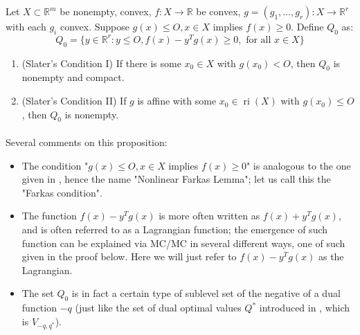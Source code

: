 \begin{prop}\label{prop:041-farkas-lemma-nonlinear}
	Let $X\subset \mathbb{R}^m$ be nonempty, convex, $f:X\to \mathbb{R}$ be convex, $g=(g_1,\dotsc,g_r):X\to \mathbb{R}^r$ with each $g_i$ convex. Suppose $g(x)\leq O,x\in X$ implies $f(x)\geq 0$. Define $Q_0$ as:
	\[
		Q_0=\{y\in \mathbb{R}^r:y\leq O,f(x)-y^Tg(x)\geq0,\text{ for all }x\in X\}
	\]
	\begin{enumerate}[label=(\alph*)]
		\item (Slater's Condition I) If there is some $x_0\in X$ with $g(x_0)<O$, then $Q_0$ is nonempty and compact.
		\item (Slater's Condition II) If $g$ is affine with some $x_0\in \operatorname{ri}(X)$ with $g(x_0)\leq O$, then $Q_0$ is nonempty.
	\end{enumerate}
\end{prop}

\paragraph{}Several comments on this proposition:
\begin{itemize}
	\item The condition "$g(x)\leq O,x\in X$ implies $f(x)\geq 0$" is analogous to the one given in , hence the name "Nonlinear Farkas Lemma"; let us call this the "Farkas condition".
	\item The function $f(x)-y^Tg(x)$ is more often written as $f(x)+y^Tg(x)$, and is often referred to as a Lagrangian function; the emergence of such function can be explained via MC/MC in several different ways, one of such given in the proof below. Here we will just refer to $f(x)-y^Tg(x)$ as the Lagrangian.
	\item The set $Q_0$ is in fact a certain type of sublevel set of the negative of a dual function $-q$ (just like the set of dual optimal values $Q^\ast$ introduced in , which is $V_{-q,q^\ast}$).
\end{itemize}

